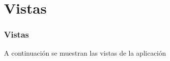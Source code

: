 \section{Vistas}
\frame
{
	\frametitle{Vistas}
	A continuación se muestran las vistas de la aplicación
}

